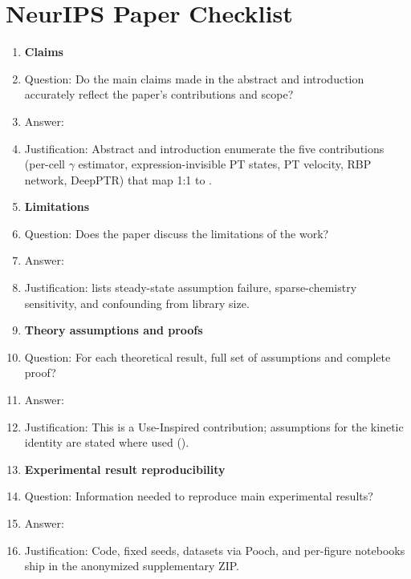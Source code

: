 
\section*{NeurIPS Paper Checklist}

\begin{enumerate}

\item {\bf Claims}
  \item[] Question: Do the main claims made in the abstract and introduction
  accurately reflect the paper's contributions and scope?
  \item[] Answer: \answerYes{}
  \item[] Justification: Abstract and introduction enumerate the five
  contributions (per-cell $\gamma$ estimator, expression-invisible PT states,
  PT velocity, RBP network, DeepPTR) that map 1:1 to .

\item {\bf Limitations}
  \item[] Question: Does the paper discuss the limitations of the work?
  \item[] Answer: \answerYes{}
  \item[] Justification:  lists steady-state assumption
  failure, sparse-chemistry sensitivity, and confounding from library size.

\item {\bf Theory assumptions and proofs}
  \item[] Question: For each theoretical result, full set of assumptions and
  complete proof?
  \item[] Answer: \answerNA{}
  \item[] Justification: This is a Use-Inspired contribution; assumptions for
  the kinetic identity are stated where used ().

\item {\bf Experimental result reproducibility}
  \item[] Question: Information needed to reproduce main experimental results?
  \item[] Answer: \answerYes{}
  \item[] Justification: Code, fixed seeds, datasets via Pooch, and
  per-figure notebooks ship in the anonymized supplementary ZIP.


\end{enumerate}

